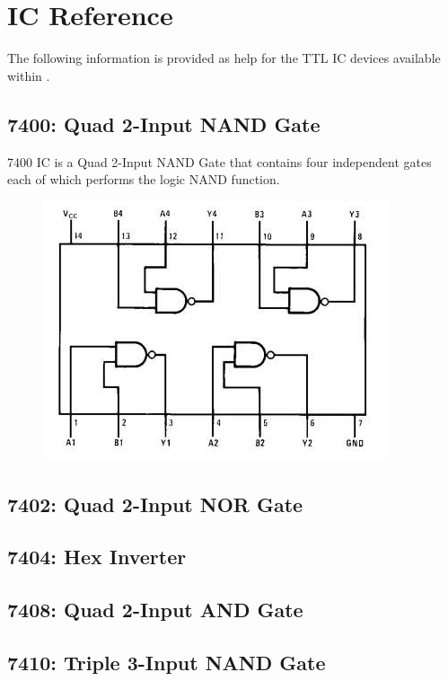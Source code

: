\chapter{IC Reference}
\label{ap:ch:icreference}

The following information is provided as help for the TTL IC devices available within \Le.

\section{7400: Quad 2-Input NAND Gate}
7400 IC is a Quad 2-Input NAND Gate that contains four independent gates each of which performs the logic NAND function.

\begin{figure}[H]
	\centering
	\includegraphics[width=\maxwidth{.95\linewidth}]{gfx/50_7400}
	\label{fig:50_7400}
\end{figure}


\section{7402: Quad 2-Input NOR Gate}

\section{7404: Hex Inverter}

\section{7408: Quad 2-Input AND Gate}

\section{7410: Triple 3-Input NAND Gate}

